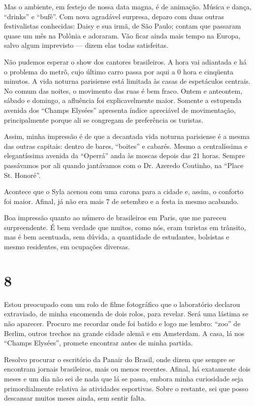 Mas o ambiente, em festejo de nossa data magna, é de animação. Música e dança, ``drinks'' e ``bufê''. Com nova agradável surpresa, deparo com duas outras festivalistas conhecidas: Daisy e sua irmã, de São Paulo; contam que passaram quase um mês na Polônia e adoraram. Vão ficar ainda mais tempo na Europa, salvo algum imprevisto --- dizem elas todas satisfeitas.

Não pudemos esperar o show dos cantores brasileiros. A hora vai adiantada e há o problema do metrô, cujo último carro passa por aqui a 0 hora e cinqüenta minutos. A vida noturna parisiense está limitada às casas de espetáculos centrais. No comum das noites, o movimento das ruas é bem fraco. Ontem e anteontem, sábado e domingo, a afluência foi explicavelmente maior. Somente a estupenda avenida dos ``Champs Elysées'' apresenta índice apreciável de movimentação, principalmente porque ali se congregam de preferência os turistas.

Assim, minha impressão é de que a decantada vida noturna parisiense é a mesma das outras capitais: dentro de bares, ``boites'' e cabarés. Mesmo a centralíssima e elegantíssima avenida da ``Operrá'' anda às moscas depois das 21 horas. Sempre passávamos por ali quando jantávamos com o Dr. Azeredo Coutinho, na ``Place St. Honoré''.

Acontece que o Syla acenou com uma carona para a cidade e, assim, o conforto foi maior. Afinal, já não era mais 7 de setembro e a festa ia mesmo acabando.

Boa impressão quanto ao número de brasileiros em Paris, que me pareceu surpreendente. É bem verdade que muitos, como nós, eram turistas em trânsito, mas é bem acentuada, sem dúvida, a quantidade de estudantes, bolsistas e mesmo residentes, em ocupações diversas.

\section*{8 \adfflatleafright {}}
Estou preocupado com um rolo de filme fotográfico que o laboratório declarou extraviado, de minha encomenda de dois rolos, para revelar. Será uma lástima se não aparecer. Procuro me recordar onde foi batido e logo me lembro: ``zoo'' de Berlim, outros trechos na grande cidade alemã e em Amsterdam. A casa, lá nos ``Champs Elysées'', promete encontrar antes de minha partida.

Resolvo procurar o escritório da Panair do Brasil, onde dizem que sempre se encontram jornais brasileiros, mais ou menos recentes. Afinal, há exatamente dois meses e um dia não sei de nada que lá se passa, embora minha curiosidade seja primordialmente relativa às atividades esportivas. Sobre o restante, sei que posso descansar muitos meses ainda, sem sentir falta.

